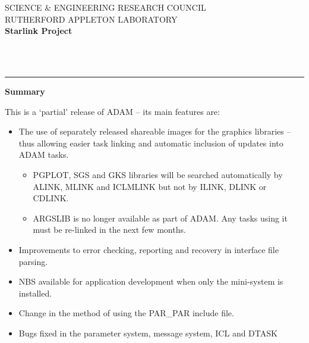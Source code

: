 \thispagestyle{empty}
SCIENCE \& ENGINEERING RESEARCH COUNCIL \hfill \stardocname\\
RUTHERFORD APPLETON LABORATORY\\
{\large\bf Starlink Project\\}
{\large\bf \stardoccategory\ \stardocnumber}
\begin{flushright}
\stardocauthors\\
\stardocdate
\end{flushright}
\vspace{-4mm}
\rule{\textwidth}{0.5mm}
\vspace{5mm}
\begin{center}
{\Large\bf \stardoctitle}
\end{center}
\vspace{20mm}
\begin{center}
{\Large\bf Summary}
\end{center}
This is a `partial' release of ADAM -- its main features are:
\begin{itemize}
\item The use of separately released shareable images for the
graphics libraries -- thus allowing easier task linking and automatic inclusion
of updates into ADAM tasks.
\begin{itemize}
\item PGPLOT, SGS and GKS libraries will be searched automatically by ALINK,
MLINK and ICLMLINK but not by ILINK, DLINK or CDLINK.
\item ARGSLIB is no longer available as part of ADAM. Any tasks using it must
be re-linked in the next few months.
\end{itemize}
\item Improvements to error checking, reporting and recovery in interface file
parsing.
\item NBS available for application development when only the
mini-system is installed.
\item Change in the method of using the PAR\_PAR include file.
\item Bugs fixed in the parameter system, message system, ICL and DTASK
\end{itemize}

\newpage
  \setlength{\parskip}{0mm}
  \tableofcontents
  \setlength{\parskip}{\medskipamount}
  \markright{\stardocname}

